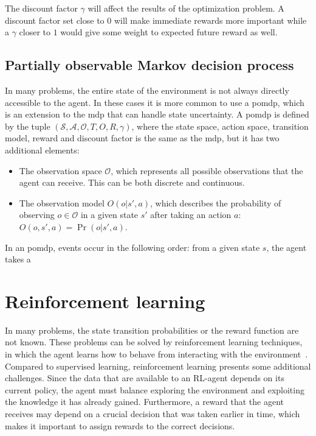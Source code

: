 The discount factor $\gamma$ will affect the results of the optimization problem. A discount factor set close to $0$ will make immediate rewards more important while a $\gamma$ closer to $1$ would give some weight to expected future reward as well. 

\subsection{Partially observable Markov decision process}\label{section:pomdp}
In many problems, the entire state of the environment is not always directly accessible to the agent. In these cases it is more common to use a \gls{pomdp}, which is an extension to the \gls{mdp} that can handle state uncertainty. A \gls{pomdp} is defined by the tuple $(\mathcal{S},\mathcal{A},\mathcal{O},T,O,R,\gamma)$, where the state space, action space, transition model, reward and discount factor is the same as the \gls{mdp}, but it has two additional elements: 
\begin{itemize}
    \item The observation space $\mathcal{O}$, which represents all possible observations that the agent can receive. This can be both discrete and continuous.
    \item The observation model $O(o|s',a)$, which describes the probability of observing $o \in \mathcal{O}$ in a given state $s'$ after taking an action $a$: $O(o,s',a)=\Pr(o|s',a)$.
\end{itemize}

In an \gls{pomdp}, events occur in the following order: from a given state $s$, the agent takes a



\section{Reinforcement learning}
In many problems, the state transition probabilities or the reward function are not known. These problems can be solved by reinforcement learning techniques, in which the agent learns how to behave from interacting with the environment~\cite[Ch. 5]{Kochenderfer2015}. Compared to supervised learning, reinforcement learning presents some additional challenges. Since the data that are available to an RL-agent depends on its current policy, the agent must balance exploring the environment and exploiting the knowledge it has already gained. Furthermore, a reward that the agent receives may depend on a crucial decision that was taken earlier in time, which makes it important to assign rewards to the correct decisions.


